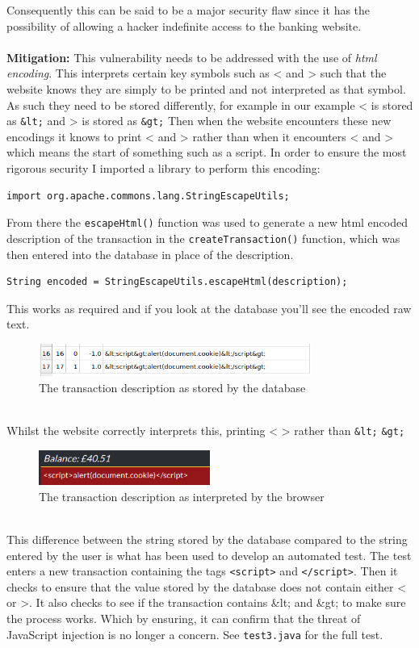 Consequently this can be said to be a major security flaw since it has the possibility of allowing a hacker indefinite access to the banking website.\\ \\
\textbf{Mitigation:} This vulnerability needs to be addressed with the use of \textit{html encoding}. This interprets certain key symbols such as < and > such that the website knows
they are simply to be printed and not interpreted as that symbol. As such they need to be stored differently, for example in our example < is stored as \verb|&lt;| and > is stored as
\verb|&gt;| Then when the website encounters these new encodings it knows to print < and > rather than when it encounters < and > which means the start of something such as a
script. In order to ensure the most rigorous security I imported a library to perform this encoding:
\begin{verbatim}
import org.apache.commons.lang.StringEscapeUtils;
\end{verbatim}
From there the \verb|escapeHtml()| function was used to generate a new html encoded description of the transaction in the \verb|createTransaction()| function, which was then
entered into the database in place of the description.
\begin{verbatim}
String encoded = StringEscapeUtils.escapeHtml(description);
\end{verbatim}
This works as required and if you look at the database you'll see the encoded raw text.
\begin{figure}[h]
  \centering
  \includegraphics[width=0.8\textwidth]{figs/database.png}
  \caption{The transaction description as stored by the database}
  \label{fig2}
\end{figure}\\
Whilst the website correctly interprets this, printing < > rather than \verb|&lt;| \verb|&gt;|
\begin{figure}[h]
  \centering
  \includegraphics[width=0.5\textwidth]{figs/websitejs.png}
  \caption{The transaction description as interpreted by the browser}
  \label{fig3}
\end{figure}\\
This difference between the string stored by the database compared to the string entered by the user is what has been used to develop an automated test. The test enters a new
transaction containing the tags \verb|<script>| and \verb|</script>|. Then it checks to ensure that the value stored by the database does not contain either < or >. It also
checks to see if the transaction contains &lt; and &gt; to make sure the process works. Which by
ensuring, it can confirm that the threat of JavaScript injection is no longer a concern. See \verb|test3.java| for the full test.